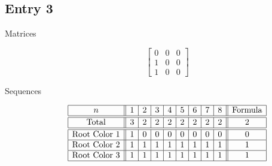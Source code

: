 \documentclass[12pt]{amsart}
\begin{document}
\subsection*{Entry 3}
\begin{description}
    \item[Matrices]
    
    \[\begin{bmatrix}
0 & 0 & 0 \\
1 & 0 & 0 \\
1 & 0 & 0
\end{bmatrix}\]
    \item[Sequences]\hspace*{\fill}\vspace{-0.5cm}
    \begin{center}
        \[
        \begin{array}{|c||c|c|c|c|c|c|c|c||c|}\hline
           n  & 1 & 2 & 3 & 4 & 5 & 6 & 7 & 8  & \text{Formula}\\\hline\hline
           \text{Total}  & 3 & 2 & 2 & 2 & 2 & 2 & 2 & 2 & 2  \\\hline\hline
           \text{Root Color }1 & 1 & 0 & 0 & 0 & 0 & 0 & 0 & 0 & 0\\\hline
           \text{Root Color }2 & 1 & 1 & 1 & 1 & 1 & 1 & 1 & 1 & 1\\\hline
           \text{Root Color }3 & 1 & 1 & 1 & 1 & 1 & 1 & 1 & 1 & 1\\\hline
        \end{array}
        \]
    \end{center}
    
    
\end{description}
\end{document}
